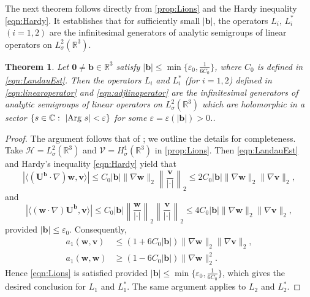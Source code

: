 \documentclass[10pt]{amsart}
\theoremstyle{plain}
\newtheorem{theorem}[lemma]{Theorem}
\theoremstyle{definition}
\theoremstyle{remark}
\numberwithin{equation}{section}
\newcommand{\R}{\mathbb{R}}
\newcommand{\bb}{{\boldsymbol{b}}}
\newcommand{\bv}{{\boldsymbol{v}}}
\newcommand{\bU}{{\boldsymbol{U}}}
\newcommand{\bw}{{\boldsymbol{w}}}
\newcommand{\ve}{\varepsilon}
\begin{document}
The next theorem follows directly from \cref{prop:Lions} and the Hardy inequality \eqref{eqn:Hardy}. It establishes that for sufficiently small $|\bb|$, the operators $L_i,\,L_i^*$ $(i=1,2)$ are the infinitesimal generators of analytic semigroups of linear operators on $L^2_{\sigma}(\mathbb R^3)$.

\begin{theorem}\label{thm:analyticsemigroup}
Let $\mathbf0\neq \bb \in \R^3$ satisfy $|\bb|\le \min\{\ve_0,\frac{1}{6C_0}\}$, where $C_0$ is defined in \cref{eqn:LandauEst}. Then the operators $L_i$ and $L_i^*$ (for $i=1,2$)  defined in \cref{eqn:linearoperator} and \cref{eqn:adjlinoperator} are the infinitesimal generators of analytic semigroups of linear operators on $L^2_{\sigma}(\mathbb R^3)$ which are holomorphic in a sector $ \{s\in \mathbb C: \ |\text{\rm Arg}\ s|<\ve\}$ for some $\ve=\ve(|\bb|) >0$..
\end{theorem}

\begin{proof}
The argument follows that of \cite[Theorem 4.2]{KarchPilarczyk2011}; we outline the details for completeness.
Take $\mathcal{H}=L^2_\sigma (\R^3)$ and $\mathcal{V}=H^1_\sigma (\R^3)$ in \cref{prop:Lions}. Then \cref{eqn:LandauEst} and Hardy's inequality \cref{eqn:Hardy} yield that
\[
|\langle (\bU^\bb \cdot \nabla) \bw , \bv \rangle| \le C_0  |\bb| \| \nabla \bw \|_2 \left\| \frac{\bv}{|\cdot|} \right\|_2
\le 2 C_0  |\bb| \| \nabla \bw \|_2 \| \nabla \bv \|_2,
\]
and 
\[
|\langle (\bw \cdot \nabla) \bU^\bb, \bv \rangle| \le C_0 |\bb| \left\| \frac{\bw}{|\cdot|} \right\|_2 
\left\| \frac{\bv}{|\cdot|} \right\|_2 
\le 4C_0 |\bb|  \| \nabla \bw \|_2 \| \nabla \bv \|_2,
\]
provided $|\bb| \le \ve_0$.
Consequently,
\begin{equation}
\begin{aligned}\label{eqn:bddcoercive}
a_1(\bw,\bv) &\le (1+6C_0|\bb|) \|\nabla \bw \|_2 \|\nabla \bv \|_2,\\ 
a_1(\bw,\bw) &\ge (1-6C_0|\bb|) \|\nabla \bw \|_2^2.
\end{aligned}   
\end{equation}
Hence \cref{eqn:Lions} is satisfied provided $|\bb| \le \min \{\ve_0,\frac{1}{6C_0}\}$, which gives the desired conclusion for $L_1$ and $L_1^*$. The same argument applies to $L_2$ and $L_2^*$.
\end{proof}
\end{document}
